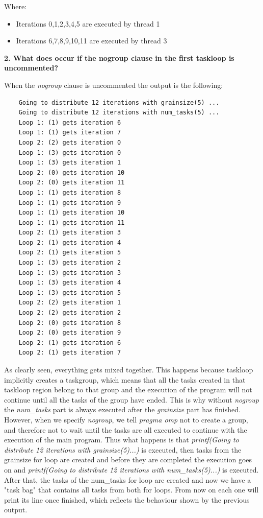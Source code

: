 \documentclass[12]{article}
\begin{document}
\begin{itemize}
    Where:
    \begin{itemize}
        \item Iterations 0,1,2,3,4,5 are executed by thread 1
        \item Iterations 6,7,8,9,10,11 are executed by thread 3
    \end{itemize}
\end{itemize}

\textbf{2. What does occur if the nogroup clause in the first taskloop is uncommented?}

When the \textit{nogroup} clause is uncommented the output is the following:

\begin{lstlisting}
    Going to distribute 12 iterations with grainsize(5) ...
    Going to distribute 12 iterations with num_tasks(5) ...
    Loop 1: (1) gets iteration 6
    Loop 1: (1) gets iteration 7
    Loop 2: (2) gets iteration 0
    Loop 1: (3) gets iteration 0
    Loop 1: (3) gets iteration 1
    Loop 2: (0) gets iteration 10
    Loop 2: (0) gets iteration 11
    Loop 1: (1) gets iteration 8
    Loop 1: (1) gets iteration 9
    Loop 1: (1) gets iteration 10
    Loop 1: (1) gets iteration 11
    Loop 2: (1) gets iteration 3
    Loop 2: (1) gets iteration 4
    Loop 2: (1) gets iteration 5
    Loop 1: (3) gets iteration 2
    Loop 1: (3) gets iteration 3
    Loop 1: (3) gets iteration 4
    Loop 1: (3) gets iteration 5
    Loop 2: (2) gets iteration 1
    Loop 2: (2) gets iteration 2
    Loop 2: (0) gets iteration 8
    Loop 2: (0) gets iteration 9
    Loop 2: (1) gets iteration 6
    Loop 2: (1) gets iteration 7
\end{lstlisting}

As clearly seen, everything gets mixed together. This happens because taskloop implicitly creates a taskgroup, which means that all the tasks created in that taskloop region belong to that group and the execution of the program will not continue until all the tasks of the group have ended. This is why without \textit{nogroup} the \textit{num\_tasks} part is always executed after the \textit{grainsize} part has finished. \\

However, when we specify \textit{nogroup}, we tell \textit{pragma omp} not to create a group, and therefore not to wait until the tasks are all executed to continue with the execution of the main program. Thus what happens is that \textit{printf(Going to distribute 12 iterations with grainsize(5)...)} is executed, then tasks from the grainsize for loop are created and before they are completed the execution goes on and \textit{printf(Going to distribute 12 iterations with num\_tasks(5)...)} is executed. After that, the tasks of the num\_tasks for loop are created and now we have a "task bag" that contains all tasks from both for loops. From now on each one will print its line once finished, which reflects the behaviour shown by the previous output.
\end{document}

